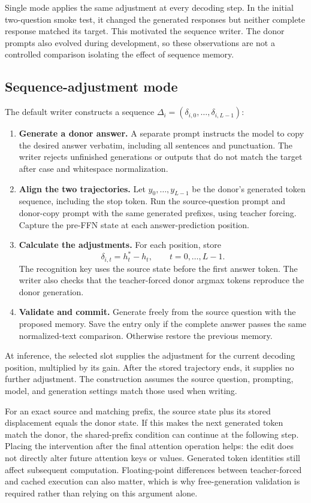 \documentclass[manuscript,screen,nonacm]{acmart}
\begin{document}
Single mode applies the same adjustment at every decoding step. In the initial two-question smoke test, it changed the generated responses but neither complete response matched its target. This motivated the sequence writer. The donor prompts also evolved during development, so these observations are not a controlled comparison isolating the effect of sequence memory.

\subsection{Sequence-adjustment mode}
The default writer constructs a sequence $\Delta_i=(\delta_{i,0},\ldots,\delta_{i,L-1})$:
\begin{enumerate}
\item \textbf{Generate a donor answer.} A separate prompt instructs the model to copy the desired answer verbatim, including all sentences and punctuation. The writer rejects unfinished generations or outputs that do not match the target after case and whitespace normalization.
\item \textbf{Align the two trajectories.} Let $y_0,\ldots,y_{L-1}$ be the donor's generated token sequence, including the stop token. Run the source-question prompt and donor-copy prompt with the same generated prefixes, using teacher forcing. Capture the pre-FFN state at each answer-prediction position.
\item \textbf{Calculate the adjustments.} For each position, store
\begin{equation}
\delta_{i,t}=h^\ast_t-h_t,\qquad t=0,\ldots,L-1.
\end{equation}
The recognition key uses the source state before the first answer token. The writer also checks that the teacher-forced donor argmax tokens reproduce the donor generation.
\item \textbf{Validate and commit.} Generate freely from the source question with the proposed memory. Save the entry only if the complete answer passes the same normalized-text comparison. Otherwise restore the previous memory.
\end{enumerate}

At inference, the selected slot supplies the adjustment for the current decoding position, multiplied by its gain. After the stored trajectory ends, it supplies no further adjustment. The construction assumes the source question, prompting, model, and generation settings match those used when writing.

For an exact source and matching prefix, the source state plus its stored displacement equals the donor state. If this makes the next generated token match the donor, the shared-prefix condition can continue at the following step. Placing the intervention after the final attention operation helps: the edit does not directly alter future attention keys or values. Generated token identities still affect subsequent computation. Floating-point differences between teacher-forced and cached execution can also matter, which is why free-generation validation is required rather than relying on this argument alone.
\end{document}
